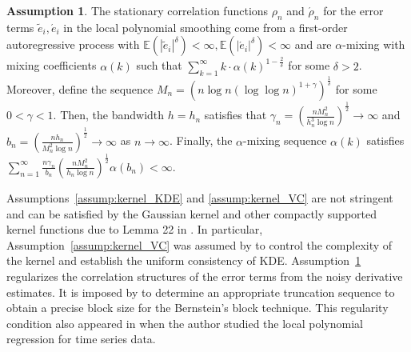 \documentclass{uwstat572}
\theoremstyle{definition}
\newtheorem{assump}{Assumption}
\renewcommand{\tilde}{\widetilde}
\theoremstyle{theorem}
\begin{document}
\begin{assump}
\label{assump:mixing}
The stationary correlation functions $\rho_n$ and $\acute{\rho}_n$ for the error terms $\tilde{e}_i,\acute{e}_i$ in the local polynomial smoothing come from a first-order autoregressive process with $\mathbb{E}\left(|\tilde{e}_i|^{\delta}\right) <\infty, \mathbb{E}\left(|\acute{e}_i|^{\delta}\right) <\infty$ and are $\alpha$-mixing with mixing coefficients $\alpha(k)$ such that $\sum_{k=1}^{\infty} k \cdot \alpha(k)^{1-\frac{2}{\delta}}$ for some $\delta >2$. Moreover, define the sequence $M_n=\left(n\log n (\log\log n)^{1+\gamma}\right)^{\frac{1}{\delta}}$ for some $0<\gamma <1$. Then, the bandwidth $h=h_n$ satisfies that $\gamma_n=\left(\frac{nM_n^2}{h_n^3 \log n}\right)^{\frac{1}{2}} \to \infty$ and $b_n=\left(\frac{nh_n}{M_n^2 \log n}\right)^{\frac{1}{2}} \to \infty$ as $n\to\infty$. Finally, the $\alpha$-mixing sequence $\alpha(k)$ satisfies $\sum_{n=1}^{\infty} \frac{n\gamma_n}{b_n}\left(\frac{nM_n^2}{h_n\log n}\right)^{\frac{1}{2}} \alpha(b_n) <\infty$.
\end{assump}

Assumptions~\ref{assump:kernel_KDE} and \ref{assump:kernel_VC} are not stringent and can be satisfied by the Gaussian kernel and other compactly supported kernel functions due to Lemma 22 in \cite{nolan1987uprocesses}. In particular, Assumption~\ref{assump:kernel_VC} was assumed by \cite{gine2002rates,Einmahl2005uniform} to control the complexity of the kernel and establish the uniform consistency of KDE. Assumption~\ref{assump:mixing} regularizes the correlation structures of the error terms from the noisy derivative estimates. It is imposed by \cite{francisco2003uniform} to determine an appropriate truncation sequence to obtain a precise block size for the Bernstein's block technique. This regularity condition also appeared in \cite{masry1996multivariate} when the author studied the local polynomial regression for time series data. 
\end{document}
